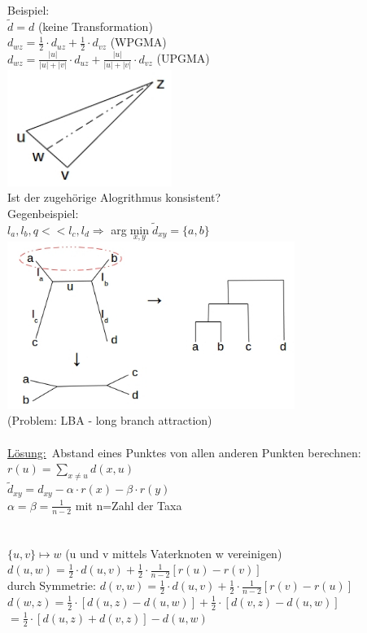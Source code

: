 Beispiel:\\
$\tilde d = d$ (keine Transformation)\\
$d_{wz}=\frac{1}{2} \cdot d_{uz} + \frac{1}{2} \cdot d_{vz}$ (WPGMA)\\
$d_{wz}=\frac{|u|}{|u| + |v|} \cdot d_{uz} + \frac{|u|}{|u| + |v|} \cdot d_{vz}$ (UPGMA)\\
\includegraphics[width=0.4\textwidth]{lectures/161221/pix/2.jpg}\\
Ist der zugehörige Alogrithmus konsistent?\\
Gegenbeispiel:\\
$l_a,l_b,q << l_c,l_d \Rightarrow $ arg$\min \limits_{x,y} \tilde d_{xy}=\{a,b\}$\\
\includegraphics[width=0.7\textwidth]{lectures/161221/pix/3.jpg}\\
(Problem: LBA - long branch attraction)\\\\
\underline{Lösung:}\
Abstand eines Punktes von allen anderen Punkten berechnen:$r(u)=\displaystyle \sum_{x \neq u}d(x,u)$\\
$\tilde d_{xy}=d_{xy}-\alpha \cdot r(x) - \beta \cdot r(y)$\\
$\alpha = \beta = \frac{1}{n-2}$ mit n=Zahl der Taxa\\

\\\\
$\{u,v\} \mapsto w$ (u und v mittels Vaterknoten w vereinigen)\\
$d(u,w)=\frac{1}{2} \cdot d(u,v) + \frac{1}{2} \cdot \frac{1}{n-2}[r(u)-r(v)]$\\
durch Symmetrie:
$d(v,w)=\frac{1}{2} \cdot d(u,v) + \frac{1}{2} \cdot \frac{1}{n-2}[r(v)-r(u)]$\\
$d(w,z)=\frac{1}{2} \cdot [d(u,z) - d(u,w)] + \frac{1}{2} \cdot [d(v,z)-d(u,w)]$\\
$=\frac{1}{2} \cdot [d(u,z) + d(v,z)] - d(u,w)$\\

